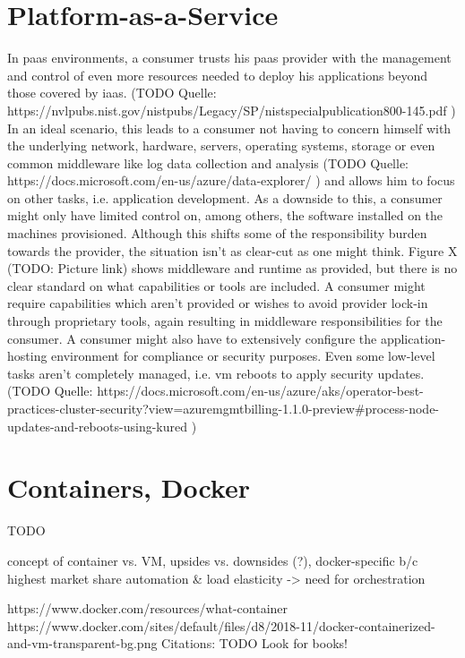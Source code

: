 
\section{Platform-as-a-Service}

In \gls{paas} environments, a consumer trusts his \gls{paas} provider with the management and control of even more resources needed to deploy his applications beyond those covered by \gls{iaas}. 
(TODO Quelle: https://nvlpubs.nist.gov/nistpubs/Legacy/SP/nistspecialpublication800-145.pdf )
In an ideal scenario, this leads to a consumer not having to concern himself with the underlying network, hardware, servers, operating systems, storage or even common middleware like log data collection and analysis 
(TODO Quelle: https://docs.microsoft.com/en-us/azure/data-explorer/ )
 and allows him to focus on other tasks, i.e. application development. As a downside to this, a consumer might only have limited control on, among others, the software installed on the  machines provisioned. 
Although this shifts some of the responsibility burden towards the provider, the situation isn't as clear-cut as one might think. 
Figure X  (TODO: Picture link) shows middleware and runtime as provided, but there is no clear standard on what capabilities or tools are included.
A consumer might require capabilities which aren't provided or wishes to avoid provider lock-in through proprietary tools, again resulting in middleware responsibilities for the consumer. 
A consumer might also have to extensively configure the application-hosting environment for compliance or security purposes. 
Even some low-level tasks aren't completely managed, i.e. \gls{vm} reboots to apply security updates. 
(TODO Quelle: https://docs.microsoft.com/en-us/azure/aks/operator-best-practices-cluster-security?view=azuremgmtbilling-1.1.0-preview\#process-node-updates-and-reboots-using-kured )


\section{Containers, Docker}
TODO

concept of container vs. VM, upsides vs. downsides (?), docker-specific b/c highest market share
automation \& load elasticity -> need for orchestration

https://www.docker.com/resources/what-container\\
https://www.docker.com/sites/default/files/d8/2018-11/docker-containerized-and-vm-transparent-bg.png
Citations: TODO Look for books! 

